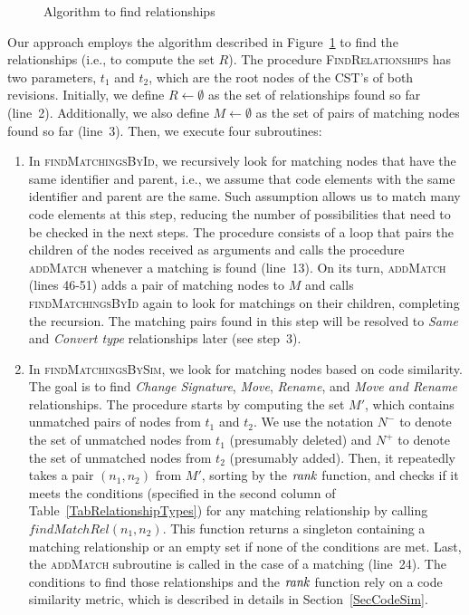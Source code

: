 \begin{figure}[htbp]
\caption{Algorithm to find relationships}
\label{AlgoGeneral}
\end{figure}

Our approach employs the algorithm described in Figure~\ref{AlgoGeneral} to find the relationships (i.e., to compute the set $R$).
The procedure \textsc{FindRelationships} has two parameters, $t_1$ and $t_2$, which are the root nodes of the CST's of both revisions.
Initially, we define $R \gets \emptyset$ as the set of relationships found so far (line~2).
Additionally, we also define $M \gets \emptyset$ as the set of pairs of matching nodes found so far (line~3).
Then, we execute four subroutines:
\begin{enumerate}

\item In \textsc{findMatchingsById}, we recursively look for matching nodes that have the same identifier and parent, i.e., we assume that code elements with the same identifier and parent are the same.
Such assumption allows us to match many code elements at this step, reducing the number of possibilities that need to be checked in the next steps.
The procedure consists of a loop that pairs the children of the nodes received as arguments and calls the procedure \textsc{addMatch} whenever a matching is found (line~13).
On its turn, \textsc{addMatch} (lines 46-51) adds a pair of matching nodes to $M$ and calls \textsc{findMatchingsById} again to look for matchings on their children, completing the recursion.
The matching pairs found in this step will be resolved to \textit{Same} and \textit{Convert type} relationships later (see step~3).

\item In \textsc{findMatchingsBySim}, we look for matching nodes based on code similarity.
The goal is to find \textit{Change Signature}, \textit{Move}, \textit{Rename}, and \textit{Move and Rename} relationships.
The procedure starts by computing the set $M'$, which contains unmatched pairs of nodes from $t_1$ and $t_2$.
We use the notation $N^-$ to denote the set of unmatched nodes from $t_1$ (presumably deleted) and $N^+$ to denote the set of unmatched nodes from $t_2$ (presumably added).
Then, it repeatedly takes a pair $(n_1, n_2)$ from $M'$, sorting by the $\operatorname{\mathit{rank}}$ function, and checks if it meets the conditions (specified in the second column of Table~\ref{TabRelationshipTypes}) for any matching relationship by calling $\mathit{findMatchRel}(n_1, n_2)$.
This function returns a singleton containing a matching relationship or an empty set if none of the conditions are met.
Last, the \textsc{addMatch} subroutine is called in the case of a matching (line~24).
The conditions to find those relationships and the $\operatorname{\mathit{rank}}$ function rely on a code similarity metric, which is described in details in Section~\ref{SecCodeSim}.


\end{enumerate}
